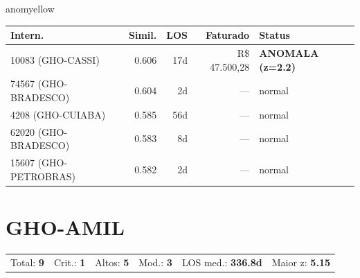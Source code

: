 \documentclass[a4paper,10pt]{article}
\begin{document}
\begin{anomalycard}[Internacao 7245 | GHO-ABERTTA | MODERADO (z=2.67)]{anomyellow}
\begin{tabular}{l r r r l}\toprule\textbf{Intern.} & \textbf{Simil.} & \textbf{LOS} & \textbf{Faturado} & \textbf{Status} \\\midrule
10083 (GHO-CASSI) & 0.606 & 17d & R\$ 47.500,28 & \textcolor{anomred}{\textbf{ANOMALA (z=2.2)}} \\
74567 (GHO-BRADESCO) & 0.604 & 2d & --- & \textcolor{jcubeblue}{normal} \\
4208 (GHO-CUIABA) & 0.585 & 56d & --- & \textcolor{jcubeblue}{normal} \\
62020 (GHO-BRADESCO) & 0.583 & 8d & --- & \textcolor{jcubeblue}{normal} \\
15607 (GHO-PETROBRAS) & 0.582 & 2d & --- & \textcolor{jcubeblue}{normal} \\
\bottomrule\end{tabular}


\end{anomalycard}

\newpage

\clearpage
\section{GHO-AMIL}
\begin{tcolorbox}[colback=lightblue,colframe=jcubeblue,title={\textbf{Resumo --- GHO-AMIL}}]
\begin{tabular}{ll@{\quad}ll@{\quad}ll}
Total: \textbf{9} &
Crit.: \textcolor{anomred}{\textbf{1}} &
Altos: \textcolor{anomorange}{\textbf{5}} &
Mod.: \textcolor{anomyellow}{\textbf{3}} &
LOS med.: \textbf{336.8d} &
Maior z: \textbf{5.15} \\


\end{tabular}
\end{tcolorbox}
\end{document}
